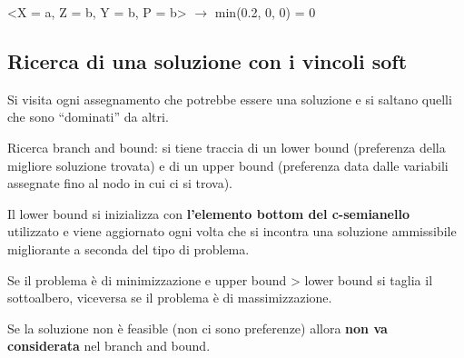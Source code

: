 <X = a, Z = b, Y = b, P = b> $\rightarrow$ min(0.2, 0, 0) = 0

\subsection{Ricerca di una soluzione con i vincoli soft}

Si visita ogni assegnamento che potrebbe essere una soluzione e si saltano
quelli che sono ``dominati'' da altri.

Ricerca branch and bound: si tiene traccia di un lower bound (preferenza
della migliore soluzione trovata) e di un upper bound (preferenza data dalle
variabili assegnate fino al nodo in cui ci si trova).

Il lower bound si inizializza con \textbf{l'elemento bottom del c-semianello}
utilizzato e viene aggiornato ogni volta che si incontra una soluzione
ammissibile migliorante a seconda del tipo di problema.

Se il problema è di minimizzazione e upper bound > lower bound si taglia il
sottoalbero, viceversa se il problema è di massimizzazione.

Se la soluzione non è feasible (non ci sono preferenze) allora
\textbf{non va considerata} nel branch and bound.
